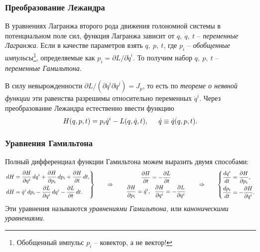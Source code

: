 \subsubsection*{Преобразование Лежандра}

\begin{to_def} 
    В уравнениях Лагранжа второго рода движения голономной системы в потенциальном поле сил, функция Лагранжа зависит от $q, \ \dot{q}, \ t$ -- \textit{переменные Лагранжа}.
    Если в качестве параметров взять $q, \ p, \ t$, где $p_i$ -- \textit{обобщенные импульсы}\footnote{
        Обобщенный импульс $p_i$ -- ковектор, а  не вектор!
    }, определяемые как
    $
        p_i = {\partial L}/{\partial \dot{q}^i}.
    $
    То получим набор $q, \ p, \ t$ -- \textit{переменные Гамильтона}. 
\end{to_def}

В силу невырожденности $\partial L / (\partial \dot{q}^i \partial \dot{q}^j) = J_{p}$, то есть по \textit{теореме о неявной функции} эти равенства разрешимы относительно переменных $\dot{q}^i$. Через преобразование Лежандра естественно ввести функцию
\begin{equation*}
    H(q, p, t) = p_i \dot{q}^i - L(q, \dot{q}, t),  \hspace{0.5cm} \dot{q} \equiv \dot{q}(q, p, t).
\end{equation*}

\subsubsection*{Уравнения Гамильтона}

Полный дифференциал функции Гамильтона можем выразить двумя способами:
\begin{equation*}
    \left.\begin{aligned}
        d H &= \frac{\partial H}{\partial q^i} \d q^i + \frac{\partial H}{\partial p_i} \d p_i + \frac{\partial H}{\partial t} \d t,
        \\
        dH &= \dot{q}^i \d p_i - \frac{\partial L}{\partial q^i} \d q^i - \frac{\partial L}{\partial t} \d t.
    \end{aligned}\right\}
    \hspace{0.7cm} \Rightarrow \hspace{0.7cm} 
    \left.\begin{gathered}
        \frac{\partial H}{\partial t} = - \frac{\partial L}{\partial t} \\
        \frac{\partial H}{\partial p_i} = \dot{q}^i, \ \ 
        \frac{\partial H}{\partial q^i} = - \frac{\partial L}{\partial q^i}
    \end{gathered}\right.
    \hspace{0.7cm} \Rightarrow \hspace{0.7cm} 
    \left\{\begin{aligned}
        \frac{d q^i}{d t} &= \frac{\partial H}{\partial p_i}, \\
        \frac{d p_i}{d t} &= - \frac{\partial H}{\partial q^i}.    
    \end{aligned}\right.
\end{equation*}
Эти уравнения называются \textit{уравнениями Гамильтона}, или \textit{каноническими уравнениями}.


